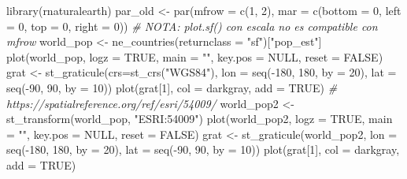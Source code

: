 \documentclass[
  spanish,
]{book}
\newenvironment{Shaded}{\begin{snugshade}}{\end{snugshade}}
\newcommand{\AttributeTok}[1]{\textcolor[rgb]{0.77,0.63,0.00}{#1}}
\newcommand{\CommentTok}[1]{\textcolor[rgb]{0.56,0.35,0.01}{\textit{#1}}}
\newcommand{\ConstantTok}[1]{\textcolor[rgb]{0.00,0.00,0.00}{#1}}
\newcommand{\DecValTok}[1]{\textcolor[rgb]{0.00,0.00,0.81}{#1}}
\newcommand{\FunctionTok}[1]{\textcolor[rgb]{0.00,0.00,0.00}{#1}}
\newcommand{\NormalTok}[1]{#1}
\newcommand{\OtherTok}[1]{\textcolor[rgb]{0.56,0.35,0.01}{#1}}
\newcommand{\SpecialCharTok}[1]{\textcolor[rgb]{0.00,0.00,0.00}{#1}}
\newcommand{\StringTok}[1]{\textcolor[rgb]{0.31,0.60,0.02}{#1}}
\theoremstyle{break}
\theoremstyle{definition}
\theoremstyle{definition}
\theoremstyle{definition}
\theoremstyle{definition}
\theoremstyle{remark}
\begin{document}
\begin{Shaded}
\begin{Highlighting}[]
\FunctionTok{library}\NormalTok{(rnaturalearth) }
\NormalTok{par\_old }\OtherTok{\textless{}{-}} \FunctionTok{par}\NormalTok{(}\AttributeTok{mfrow =} \FunctionTok{c}\NormalTok{(}\DecValTok{1}\NormalTok{, }\DecValTok{2}\NormalTok{), }\AttributeTok{mar =} \FunctionTok{c}\NormalTok{(}\AttributeTok{bottom =} \DecValTok{0}\NormalTok{, }\AttributeTok{left =} \DecValTok{0}\NormalTok{, }\AttributeTok{top =} \DecValTok{0}\NormalTok{, }\AttributeTok{right =} \DecValTok{0}\NormalTok{))}
\CommentTok{\# NOTA: plot.sf() con escala no es compatible con mfrow }
\NormalTok{world\_pop }\OtherTok{\textless{}{-}} \FunctionTok{ne\_countries}\NormalTok{(}\AttributeTok{returnclass =} \StringTok{"sf"}\NormalTok{)[}\StringTok{"pop\_est"}\NormalTok{]}
\FunctionTok{plot}\NormalTok{(world\_pop, }\AttributeTok{logz =} \ConstantTok{TRUE}\NormalTok{, }\AttributeTok{main =} \StringTok{""}\NormalTok{, }\AttributeTok{key.pos =} \ConstantTok{NULL}\NormalTok{, }\AttributeTok{reset =} \ConstantTok{FALSE}\NormalTok{)}
\NormalTok{grat }\OtherTok{\textless{}{-}} \FunctionTok{st\_graticule}\NormalTok{(}\AttributeTok{crs=}\FunctionTok{st\_crs}\NormalTok{(}\StringTok{"WGS84"}\NormalTok{), }\AttributeTok{lon =} \FunctionTok{seq}\NormalTok{(}\SpecialCharTok{{-}}\DecValTok{180}\NormalTok{, }\DecValTok{180}\NormalTok{, }\AttributeTok{by =} \DecValTok{20}\NormalTok{), }\AttributeTok{lat =} \FunctionTok{seq}\NormalTok{(}\SpecialCharTok{{-}}\DecValTok{90}\NormalTok{, }\DecValTok{90}\NormalTok{, }\AttributeTok{by =} \DecValTok{10}\NormalTok{))}
\FunctionTok{plot}\NormalTok{(grat[}\DecValTok{1}\NormalTok{], }\AttributeTok{col =} \StringTok{\textquotesingle{}darkgray\textquotesingle{}}\NormalTok{, }\AttributeTok{add =} \ConstantTok{TRUE}\NormalTok{)}
\CommentTok{\# https://spatialreference.org/ref/esri/54009/}
\NormalTok{world\_pop2 }\OtherTok{\textless{}{-}} \FunctionTok{st\_transform}\NormalTok{(world\_pop, }\StringTok{"ESRI:54009"}\NormalTok{) }
\FunctionTok{plot}\NormalTok{(world\_pop2, }\AttributeTok{logz =} \ConstantTok{TRUE}\NormalTok{, }\AttributeTok{main =} \StringTok{""}\NormalTok{, }\AttributeTok{key.pos =} \ConstantTok{NULL}\NormalTok{, }\AttributeTok{reset =} \ConstantTok{FALSE}\NormalTok{)}
\NormalTok{grat }\OtherTok{\textless{}{-}} \FunctionTok{st\_graticule}\NormalTok{(world\_pop2, }\AttributeTok{lon =} \FunctionTok{seq}\NormalTok{(}\SpecialCharTok{{-}}\DecValTok{180}\NormalTok{, }\DecValTok{180}\NormalTok{, }\AttributeTok{by =} \DecValTok{20}\NormalTok{), }\AttributeTok{lat =} \FunctionTok{seq}\NormalTok{(}\SpecialCharTok{{-}}\DecValTok{90}\NormalTok{, }\DecValTok{90}\NormalTok{, }\AttributeTok{by =} \DecValTok{10}\NormalTok{))}
\FunctionTok{plot}\NormalTok{(grat[}\DecValTok{1}\NormalTok{], }\AttributeTok{col =} \StringTok{\textquotesingle{}darkgray\textquotesingle{}}\NormalTok{, }\AttributeTok{add =} \ConstantTok{TRUE}\NormalTok{)}
\end{Highlighting}
\end{Shaded}
\end{document}
